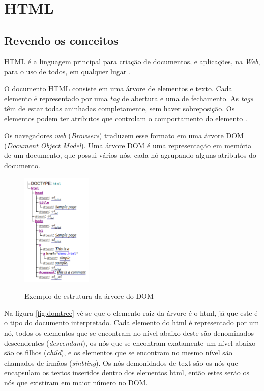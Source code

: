 %
%

\chapter{HTML}
\label{chap:HTML}
\section{Revendo os conceitos}
HTML é a linguagem principal para criação de documentos, e aplicações, na \textit{Web}, para o uso de todos, em qualquer lugar \cite{W3Chtml2015}.

O documento HTML consiste em uma árvore de elementos e texto. Cada elemento é representado por uma \textit{tag} de abertura e uma de fechamento. As \textit{tags} têm de estar todas aninhadas completamente, sem haver sobreposição. Os elementos podem ter atributos que controlam o comportamento do elemento \cite{HTMLspec2014}.

Os navegadores \textit{web} (\textit{Browsers}) traduzem esse formato em uma árvore DOM (\textit{Document Object Model}). Uma árvore DOM é uma representação em memória de um documento, que possui vários nós, cada nó agrupando alguns atributos do documento.

\begin{figure}[!htb]
	\centering
	\caption{Exemplo de estrutura da árvore do DOM}
	\includegraphics[width=0.3\textwidth]{./04-figuras/DOMsnippet}
	\label{fig:domtree}
\end{figure}

Na figura \autoref{fig:domtree} vê-se que o elemento raiz da árvore é o html, já que este é o tipo do documento interpretado. Cada elemento do html é representado por um nó, todos os elementos que se encontram no nível abaixo deste são denominados descendentes (\textit{descendant}), os nós que se encontram exatamente um nível abaixo são os filhos (\textit{child}), e os elementos que se encontram no mesmo nível são chamados de irmãos (\textit{sinbling}). Os nós demonidados de text são os nós que encapsulam os textos inseridos dentro dos elementos html, então estes serão os nós que existiram em maior número no DOM.

